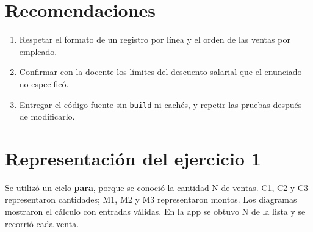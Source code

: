 \documentclass[12pt,letterpaper]{article}
\begin{document}
\section{Recomendaciones}
\begin{enumerate}
\item Respetar el formato de un registro por línea y el orden de las ventas por empleado.
\item Confirmar con la docente los límites del descuento salarial que el enunciado no especificó.
\item Entregar el código fuente sin \texttt{build} ni cachés, y repetir las pruebas después de modificarlo.
\end{enumerate}

\section{Representación del ejercicio 1}
Se utilizó un ciclo \textbf{para}, porque se conoció la cantidad N de ventas. C1, C2 y C3 representaron cantidades; M1, M2 y M3 representaron montos. Los diagramas mostraron el cálculo con entradas válidas. En la app se obtuvo N de la lista y se recorrió cada venta.
\end{document}
